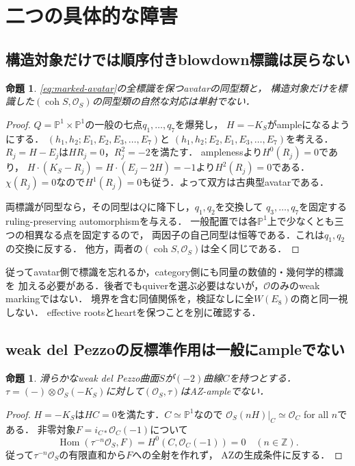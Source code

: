 \documentclass[11pt,a4paper]{ltjsarticle}
\newtheorem{proposition}[theorem]{命題}
\theoremstyle{definition}
\newcommand{\OO}{\mathcal O}
\newcommand{\Hom}{\operatorname{Hom}}
\newcommand{\coh}{\operatorname{coh}}
\begin{document}
\section{二つの具体的な障害}
\subsection{構造対象だけでは順序付きblowdown標識は戻らない}
\begin{proposition}\label{prop:marking}
\eqref{eq:marked-avatar}の全標識を保つavatarの同型類と，
構造対象だけを標識した$(\coh S,\OO_S)$の同型類の自然な対応は単射でない．
\end{proposition}
\begin{proof}
$Q=\mathbb P^1\times\mathbb P^1$の一般の七点$q_1,\ldots,q_7$を爆発し，
$H=-K_S$がampleになるようにする．
$(h_1,h_2;E_1,E_2,E_3,\ldots,E_7)$と
$(h_1,h_2;E_2,E_1,E_3,\ldots,E_7)$を考える．
$R_j=H-E_j$は$H R_j=0$，$R_j^2=-2$を満たす．
amplenessより$H^0(R_j)=0$であり，
$H\cdot(K_S-R_j)=H\cdot(E_j-2H)=-1$より$H^2(R_j)=0$である．
$\chi(R_j)=0$なので$H^1(R_j)=0$も従う．よって双方は古典型avatarである．

両標識が同型なら，その同型は$Q$に降下し，$q_1,q_2$を交換して
$q_3,\ldots,q_7$を固定するruling-preserving automorphismを与える．
一般配置では各$\mathbb P^1$上で少なくとも三つの相異なる点を固定するので，
両因子の自己同型は恒等である．これは$q_1,q_2$の交換に反する．
他方，両者の$(\coh S,\OO_S)$は全く同じである．
\end{proof}

従ってavatar側で標識を忘れるか，category側にも同量の数値的・幾何学的標識を
加える必要がある．後者でもquiverを選ぶ必要はないが，$\OO$のみのweak markingではない．
境界を含む同値関係を，検証なしに全$W(E_8)$の商と同一視しない．
effective rootsとheartを保つことを別に確認する．

\subsection{weak del Pezzoの反標準作用は一般にampleでない}
\begin{proposition}\label{prop:weak}
滑らかなweak del Pezzo曲面$S$が$(-2)$曲線$C$を持つとする．
$\tau=(-)\otimes\OO_S(-K_S)$に対して$(\OO_S,\tau)$はAZ-ampleでない．
\end{proposition}
\begin{proof}
$H=-K_S$は$H C=0$を満たす．$C\simeq\mathbb P^1$なので
$\OO_S(nH)|_C\simeq\OO_C$ for all $n$である．
非零対象$F=i_{C*}\OO_C(-1)$について
\[
 \Hom(\tau^{-n}\OO_S,F)
 =H^0(C,\OO_C(-1))=0
 \quad(n\in\mathbb Z).
\]
従って$\tau^{-n}\OO_S$の有限直和から$F$への全射を作れず，
AZの生成条件に反する．
\end{proof}
\end{document}
